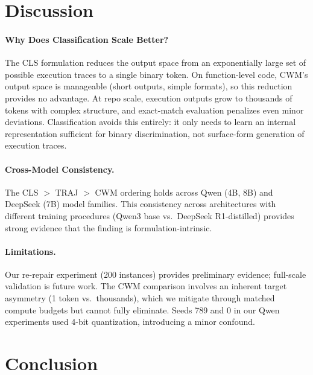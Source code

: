 \documentclass[11pt,a4paper]{article}
\begin{document}
\section{Discussion}

\paragraph{Why Does Classification Scale Better?}
The CLS formulation reduces the output space from an exponentially large set of possible execution traces to a single binary token.
On function-level code, CWM's output space is manageable (short outputs, simple formats), so this reduction provides no advantage.
At repo scale, execution outputs grow to thousands of tokens with complex structure, and exact-match evaluation penalizes even minor deviations.
Classification avoids this entirely: it only needs to learn an internal representation sufficient for binary discrimination, not surface-form generation of execution traces.

\paragraph{Cross-Model Consistency.}
The CLS $>$ TRAJ $>$ CWM ordering holds across Qwen (4B, 8B) and DeepSeek (7B) model families.
This consistency across architectures with different training procedures (Qwen3 base vs.\ DeepSeek R1-distilled) provides strong evidence that the finding is formulation-intrinsic.

\paragraph{Limitations.}
Our re-repair experiment (200 instances) provides preliminary evidence; full-scale validation is future work.
The CWM comparison involves an inherent target asymmetry (1 token vs.\ thousands), which we mitigate through matched compute budgets but cannot fully eliminate.
Seeds 789 and 0 in our Qwen experiments used 4-bit quantization, introducing a minor confound.

\section{Conclusion}
\end{document}

